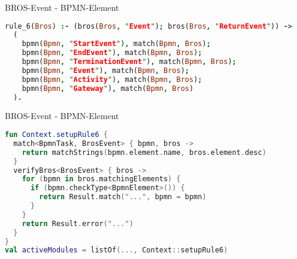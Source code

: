 \begin{frame}[fragile]{BROS-Event - BPMN-Element}
\begin{lstlisting}[language=Prolog]
rule_6(Bros) :- (bros(Bros, "Event"); bros(Bros, "ReturnEvent")) ->
  (
    bpmn(Bpmn, "StartEvent"), match(Bpmn, Bros);
    bpmn(Bpmn, "EndEvent"), match(Bpmn, Bros);
    bpmn(Bpmn, "TerminationEvent"), match(Bpmn, Bros);
    bpmn(Bpmn, "Event"), match(Bpmn, Bros);
    bpmn(Bpmn, "Activity"), match(Bpmn, Bros);
    bpmn(Bpmn, "Gateway"), match(Bpmn, Bros)
  ).
\end{lstlisting}
\end{frame}

\begin{frame}[fragile]{BROS-Event - BPMN-Element}
\begin{lstlisting}[language=Kotlin]
fun Context.setupRule6 {
  match<BpmnTask, BrosEvent> { bpmn, bros ->
    return matchStrings(bpmn.element.name, bros.element.desc)
  }
  verifyBros<BrosEvent> { bros ->
    for (bpmn in bros.matchingElements) {
      if (bpmn.checkType<BpmnElement>()) {
        return Result.match("...", bpmn = bpmn)
      }
    }
    return Result.error("...")
  }
}
val activeModules = listOf(..., Context::setupRule6)
\end{lstlisting}
\end{frame}
